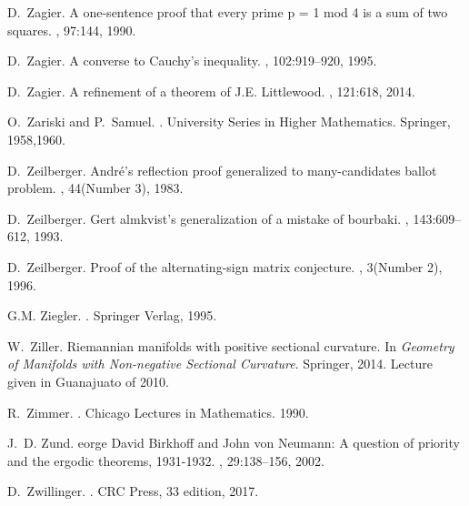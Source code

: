 \documentclass[12pt]{amsart}
\begin{document}
\begin{thebibliography}{100}
D.~Zagier.
\newblock A one-sentence proof that every prime p = 1 mod 4 is a sum of two
  squares.
, 97:144, 1990.

D.~Zagier.
\newblock A converse to {C}auchy's inequality.
, 102:919--920, 1995.

D.~Zagier.
\newblock A refinement of a theorem of {J.E. L}ittlewood.
, 121:618, 2014.

O.~Zariski and P.~Samuel.
.
\newblock University Series in Higher Mathematics. Springer, 1958,1960.

D.~Zeilberger.
\newblock Andr{\'e}'s reflection proof generalized to many-candidates ballot
  problem.
, 44(Number 3), 1983.

D.~Zeilberger.
\newblock Gert almkvist's generalization of a mistake of bourbaki.
, 143:609--612, 1993.

D.~Zeilberger.
\newblock Proof of the alternating-sign matrix conjecture.
, 3(Number 2), 1996.

G.M. Ziegler.
.
\newblock Springer Verlag, 1995.

W.~Ziller.
\newblock Riemannian manifolds with positive sectional curvature.
\newblock In {\em Geometry of Manifolds with Non-negative Sectional Curvature}.
  Springer, 2014.
\newblock Lecture given in Guanajuato of 2010.

R.~Zimmer.
.
\newblock Chicago Lectures in Mathematics. 1990.

J.~D. Zund.
eorge {D}avid {B}irkhoff and {J}ohn von {N}eumann: A question of
  priority and the ergodic theorems, 1931-1932.
, 29:138--156, 2002.

D.~Zwillinger.
.
\newblock CRC Press, 33 edition, 2017.

\end{thebibliography}
\end{document}

